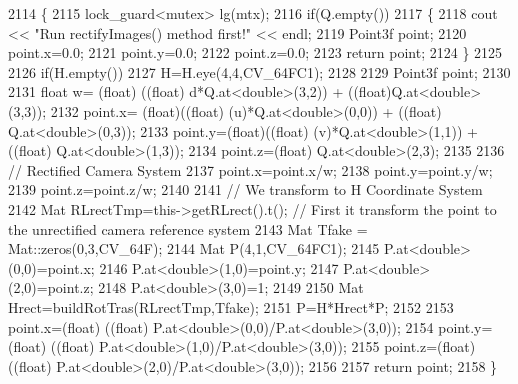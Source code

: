 \begin{DoxyCode}
2114 \{
2115     lock\_guard<mutex> lg(mtx);
2116     \textcolor{keywordflow}{if}(Q.empty())
2117     \{
2118         cout << \textcolor{stringliteral}{"Run rectifyImages() method first!"} << endl;
2119         Point3f point;
2120         point.x=0.0;
2121         point.y=0.0;
2122         point.z=0.0;
2123         \textcolor{keywordflow}{return} point;
2124     \}
2125 
2126     \textcolor{keywordflow}{if}(H.empty())
2127         H=H.eye(4,4,CV\_64FC1);
2128 
2129     Point3f point;
2130 
2131     \textcolor{keywordtype}{float} w= (float) ((\textcolor{keywordtype}{float}) d*Q.at<\textcolor{keywordtype}{double}>(3,2)) + ((float)Q.at<\textcolor{keywordtype}{double}>(3,3));
2132     point.x= (float)((\textcolor{keywordtype}{float}) (u)*Q.at<\textcolor{keywordtype}{double}>(0,0)) + ((\textcolor{keywordtype}{float}) Q.at<\textcolor{keywordtype}{double}>(0,3));
2133     point.y=(float)((\textcolor{keywordtype}{float}) (v)*Q.at<\textcolor{keywordtype}{double}>(1,1)) + ((\textcolor{keywordtype}{float}) Q.at<\textcolor{keywordtype}{double}>(1,3));
2134     point.z=(float) Q.at<\textcolor{keywordtype}{double}>(2,3);
2135 
2136     \textcolor{comment}{// Rectified Camera System}
2137     point.x=point.x/w;
2138     point.y=point.y/w;
2139     point.z=point.z/w;
2140 
2141     \textcolor{comment}{// We transform to H Coordinate System}
2142     Mat RLrectTmp=this->getRLrect().t(); \textcolor{comment}{// First it transform the point to the unrectified camera
       reference system}
2143     Mat Tfake = Mat::zeros(0,3,CV\_64F);
2144     Mat P(4,1,CV\_64FC1);
2145     P.at<\textcolor{keywordtype}{double}>(0,0)=point.x;
2146     P.at<\textcolor{keywordtype}{double}>(1,0)=point.y;
2147     P.at<\textcolor{keywordtype}{double}>(2,0)=point.z;
2148     P.at<\textcolor{keywordtype}{double}>(3,0)=1;
2149 
2150     Mat Hrect=buildRotTras(RLrectTmp,Tfake);
2151     P=H*Hrect*P;
2152 
2153     point.x=(float) ((\textcolor{keywordtype}{float}) P.at<\textcolor{keywordtype}{double}>(0,0)/P.at<\textcolor{keywordtype}{double}>(3,0));
2154     point.y=(float) ((\textcolor{keywordtype}{float}) P.at<\textcolor{keywordtype}{double}>(1,0)/P.at<\textcolor{keywordtype}{double}>(3,0));
2155     point.z=(float) ((\textcolor{keywordtype}{float}) P.at<\textcolor{keywordtype}{double}>(2,0)/P.at<\textcolor{keywordtype}{double}>(3,0));
2156 
2157     \textcolor{keywordflow}{return} point;
2158 \}
\end{DoxyCode}
\mbox{\label{classStereoCamera_a3c8ef84424fa111c63437a3db8f04333}} 
